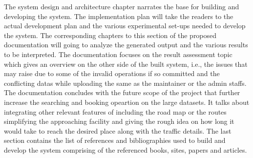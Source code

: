 \documentclass[12pt]{report}
\begin{document}
The system design and architecture chapter narrates the base for building and developing the system. The implementation plan will take the readers to the actual development plan and the various experimental set-ups needed to develop the system. The corresponding chapters to this section of the proposed documentation will going to analyze the generated output and the various results to be interpreted. The documentation focuses on the result assessment topic which gives an overview on the other side of the built system, i.e., the issues that may raise due to some of the invalid operations if so committed and the conflicting datas while uploading the same as the maintainer or the admin staffs. \newline
The documentation concludes with the future scope of the project that further increase the searching and booking opeartion on the large datasets. It talks about integrating other relevant features of including the road map or the  routes simplifying the approaching facility and giving the rough idea on how long it would take to reach the desired place along with the traffic details. The last section contains the list of references and bibliographies used to build and develop the system comprising of the referenced books, sites, papers and articles.   
\end{document}
